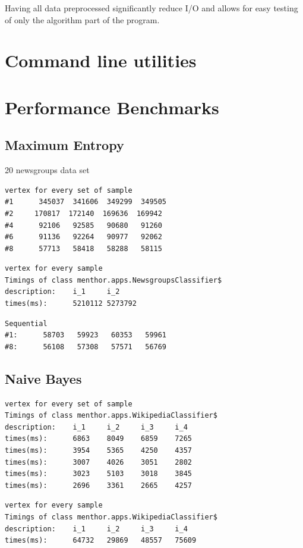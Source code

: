 \documentclass{report}
\begin{document}
Having all data preprocessed significantly reduce I/O and allows for easy testing of only the algorithm part of the program.

\section{Command line utilities}

\section{Performance Benchmarks}

\subsection{Maximum Entropy}

20 newsgroups data set

\begin{lstlisting}
vertex for every set of sample
#1      345037  341606  349299  349505
#2     170817  172140  169636  169942
#4      92106   92585   90680   91260
#6      91136   92264   90977   92062
#8      57713   58418   58288   58115
\end{lstlisting}

\begin{lstlisting}
vertex for every sample
Timings of class menthor.apps.NewsgroupsClassifier$
description:    i_1     i_2
times(ms):      5210112 5273792
\end{lstlisting}

\begin{lstlisting}
Sequential
#1:      58703   59923   60353   59961
#8:      56108   57308   57571   56769
\end{lstlisting}

\subsection{Naive Bayes}

\begin{lstlisting}
vertex for every set of sample
Timings of class menthor.apps.WikipediaClassifier$
description:    i_1     i_2     i_3     i_4
times(ms):      6863    8049    6859    7265
times(ms):      3954    5365    4250    4357
times(ms):      3007    4026    3051    2802
times(ms):      3023    5103    3018    3845
times(ms):      2696    3361    2665    4257
\end{lstlisting}

\begin{lstlisting}
vertex for every sample
Timings of class menthor.apps.WikipediaClassifier$
description:    i_1     i_2     i_3     i_4
times(ms):      64732   29869   48557   75609
\end{lstlisting}
\end{document}
